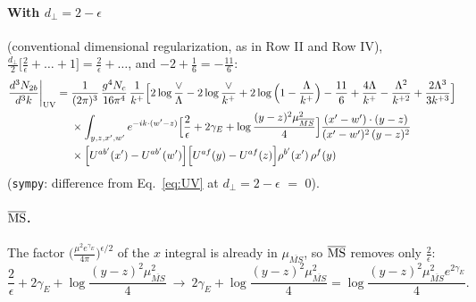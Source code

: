 \documentclass[10pt]{article}
\numberwithin{equation}{section}
\begin{document}
\paragraph{With $d_\perp=2-\epsilon$} (conventional dimensional regularization, as in Row II and Row IV), $\frac{d_\perp}{2}\big[\frac2\epsilon+\dots+1\big]=\frac2\epsilon+\dots$, and $-2+\frac16=-\frac{11}{6}$:
\begin{align}
\frac{d^{3}N_{2b}}{d^{3}k}\bigg|_{\rm UV}={}&\frac{1}{(2\pi)^{3}}\,\frac{g^{4}N_{c}}{16\pi^{4}}\,\frac{1}{k^{+}}\Big[2\log\frac{\vee}{\Lambda}-2\log\frac{\vee}{k^{+}}+2\log\Big(1-\frac{\Lambda}{k^{+}}\Big)-\frac{11}{6}+\frac{4\Lambda}{k^{+}}-\frac{\Lambda^{2}}{k^{+2}}+\frac{2\Lambda^{3}}{3k^{+3}}\Big]\notag\\
&\times\int_{y,z,x',w'}e^{-ik\cdot(w'-z)}\Big[\frac{2}{\epsilon}+2\gamma_{E}+\log\frac{(y-z)^{2}\mu^{2}_{\overline{MS}}}{4}\Big]\frac{(x'-w')\cdot(y-z)}{(x'-w')^{2}\,(y-z)^{2}}\notag\\
&\times\Big[U^{ab'}(x')-U^{ab'}(w')\Big]\Big[U^{af}(y)-U^{af}(z)\Big]\rho^{b'}(x')\,\rho^{f}(y)
\label{eq:UVcdr}
\end{align}
(\texttt{sympy}: difference from Eq.~\eqref{eq:UV} at $d_\perp=2-\epsilon$ $=$ $0$).

\paragraph{$\overline{\rm MS}$.} The factor $\big(\frac{\mu^2e^{\gamma_E}}{4\pi}\big)^{\epsilon/2}$ of the $x$ integral is already in $\mu_{\overline{MS}}$, so $\overline{\rm MS}$ removes only $\frac2\epsilon$:
\begin{equation}
\frac{2}{\epsilon}+2\gamma_{E}+\log\frac{(y-z)^{2}\mu^{2}_{\overline{MS}}}{4}\ \longrightarrow\ 2\gamma_E+\log\frac{(y-z)^{2}\mu^{2}_{\overline{MS}}}{4}=\log\frac{(y-z)^{2}\mu^{2}_{\overline{MS}}e^{2\gamma_E}}{4}.
\end{equation}
\end{document}
